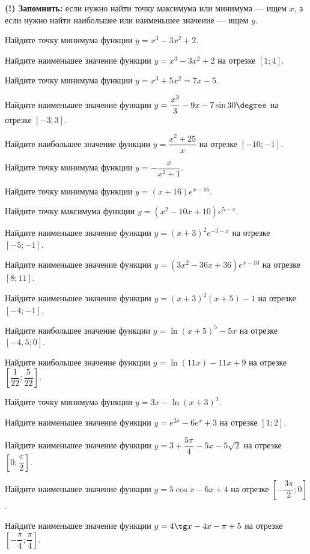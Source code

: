 \begin{class}[number=3]
	\textbf{(!) Запомнить:} если нужно найти точку максимума или минимума --- ищем \( x \), а если нужно найти наибольшее или наименьшее значение --- ищем \( y \).
\begin{listofex}
	\item Найдите точку минимума функции \( y=x^3-3x^2+2 \).
	\item Найдите наименьшее значение функции \( y=x^3-3x^2+2 \) на отрезке \( [1;4] \).
	\item Найдите точку минимума функции \( y=x^3+5x^2=7x-5 \).
	\item Найдите наименьшее значение функции \( y=\dfrac{x^3}{3}-9x-7\sin30\degree \) на отрезке \( [-3;3] \).
	\item Найдите наибольшее значение функции \( y=\dfrac{x^2+25}{x} \) на отрезке \( [-10;-1] \).
	\item Найдите точку минимума функции \( y=-\dfrac{x}{x^2+1} \).
	\item Найдите точку минимума функции \( y=(x+16)e^{x-16} \).
	\item Найдите точку максимума функции \( y=(x^2-10x+10)e^{5-x} \).
	\item Найдите наименьшее значение функции \( y=(x+3)^2e^{-3-x} \) на отрезке \( [-5;-1] \).
	\item Найдите наименьшее значение функции \( y=(3x^2-36x+36)e^{x-10} \) на отрезке \( [8;11] \).
	\item Найдите наименьшее значение функции \( y=(x+3)^2(x+5)-1 \) на отрезке \( [-4;-1] \).
	\item Найдите наибольшее значение функции \( y=\ln(x+5)^5-5x \) на отрезке \( [-4,5;0] \).
	\item Найдите наибольшее значение функции \( y=\ln(11x)-11x+9 \) на отрезке \( \left[ \dfrac{1}{22};\dfrac{5}{22} \right] \).
	\item Найдите точку минимума функции \( y=3x-\ln(x+3)^3 \).
	\item Найдите наименьшее значение функции \( y=e^{2x}-6e^x+3 \) на отрезке \( [1;2] \).
	\item Найдите наименьшее значение функции \( y=3+\dfrac{5\pi}{4}-5x-5\sqrt{2} \) на отрезке \( \left[ 0;\dfrac{\pi}{2} \right] \).
	\item Найдите наименьшее значение функции \( y=5\cos x - 6x+4 \) на отрезке \( \left[ -\dfrac{3\pi}{2};0 \right] \).
	\item Найдите наименьшее значение функции \( y=4\tg x - 4x - \pi + 5 \) на отрезке \( \left[ -\dfrac{\pi}{4};\dfrac{\pi}{4}\right] \).

\end{listofex}
\end{class}
